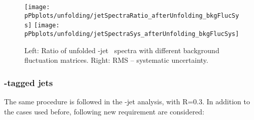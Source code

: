 \begin{figure}[bth]
\centering
\texttt{[image: pPbplots/unfolding/jetSpectraRatio\_afterUnfolding\_bkgFlucSys]}
\texttt{[image: pPbplots/unfolding/jetSpectraSys\_afterUnfolding\_bkgFlucSys]}
\caption{ Left: Ratio of unfolded \Dstar-jet \pt\ spectra with different background fluctuation matrices. Right: RMS -- systematic uncertainty.}
\label{fig:BkgFlucSys}
\end{figure}

\subsubsection{\Dzero-tagged jets}
The same procedure is followed in the \Dzero-jet analysis, with R=0.3.
In addition to the cases used before, following new requirement are considered:
